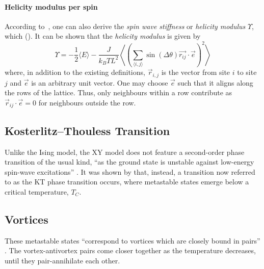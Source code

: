 		\paragraph{Helicity modulus per spin}
			According to~\cite{teitel_helicity}, one can also derive the \emph{spin wave stiffness} or \emph{helicity modulus} $\Upsilon$, which  (\cite[p. 598]{teitel_helicity}). It can be shown that the \emph{helicity modulus} is given by
			\begin{equation}\label{eq:helicity_modulus}
				\Upsilon = -\frac{1}{2} \langle E \rangle - \frac{J}{k_B T L^2} \left\langle \left(\sum_{\langle i,j \rangle}{\sin(\Delta \theta) \vec{r_{ij}} \cdot \vec{e}}\right)^2 \right\rangle
			\end{equation}
			\cite[eq. 3.2]{teitel_helicity} where, in addition to the existing definitions, $\vec{r}_{i,j}$ is the vector from site $i$ to site $j$ and $\vec{e}$ is an arbitrary unit vector. One may choose $\vec{e}$ such that it aligns along the rows of the lattice. Thus, only neighbours within a row contribute as $\vec{r}_{ij} \cdot \vec{e} = 0$ for neighbours outside the row.
	
	\subsection{Kosterlitz–Thouless Transition}
		Unlike the Ising model, the XY model does not feature a second-order phase transition of the usual kind, \enquote{as the ground state is unstable against low-energy spin-wave excitations} \cite[p. 1190]{kosterlitz}. It was shown by \cite{kosterlitz} that, instead, a transition now referred to as the KT phase transition occurs, where metastable states emerge below a critical temperature, $T_C$.
	
	\subsection{Vortices}
		These metastable states \enquote{correspond to vortices which are closely bound in pairs} \cite[p. 1190]{kosterlitz}. The vortex-antivortex pairs come closer together as the temperature decreases, until they pair-annihilate each other.